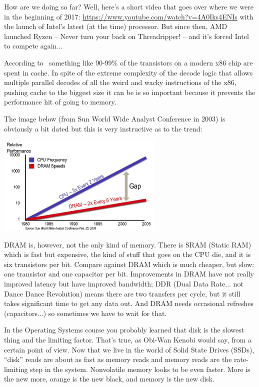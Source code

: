 \documentclass[a4paper]{report}
\begin{document}
How are we doing so far? Well, here's a short video that goes over where we were in the beginning of 2017: \url{https://www.youtube.com/watch?v=4A0Iks4ENIs} with the launch of Intel's latest (at the time) processor. But since then, AMD launched Ryzen -- Never turn your back on Threadripper! -- and it's forced Intel to compete again... 

According to~\cite{modern-hardware} something like 90-99\% of the transistors on a modern x86 chip are spent in cache. In spite of the extreme complexity of the decode logic that allows multiple parallel decodes of all the weird and wacky instructions of the x86, pushing cache to the biggest size it can be is so important because it prevents the performance hit of going to memory.

The image below (from Sun World Wide Analyst Conference in 2003) is obviously a bit dated but this is very instructive as to the trend:
\begin{center}
\includegraphics[width=0.6\textwidth]{images/ram-vs-cpu.png}
\end{center}

DRAM is, however, not the only kind of memory. There is SRAM (Static RAM) which is fast but expensive, the kind of stuff that goes on the CPU die, and it is six transistors per bit. Compare against DRAM which is much cheaper, but slow: one transistor and one capacitor per bit. Improvements in DRAM have not really improved latency but have improved bandwidth; DDR (Dual Data Rate... not Dance Dance Revolution) means there are two transfers per cycle, but it still takes significant time to get any data out. And DRAM needs occasional refreshes (capacitors...) so sometimes we have to wait for that.

In the Operating Systems course you probably learned that disk is the slowest thing and the limiting factor. That's true, as Obi-Wan Kenobi would say, from a certain point of view. Now that we live in the world of Solid State Drives (SSDs), ``disk'' reads are about as fast as memory reads and memory reads are the rate-limiting step in the system. Nonvolatile memory looks to be even faster. More is the new more, orange is the new black, and memory is the new disk.
\end{document}

